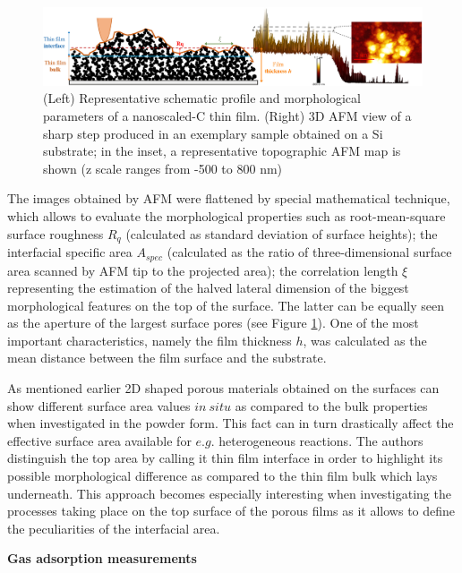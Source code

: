 \begin{figure}[H]
\centering
\includegraphics[width=1\textwidth]{Figures/Theory/AFM_Borghi.jpg}
\medskip
\caption{(Left) Representative schematic profile and morphological parameters of a nanoscaled-C thin film. (Right) 3D AFM view of a sharp step produced in an exemplary sample obtained on a Si substrate; in the inset, a representative topographic AFM map is shown (z scale ranges from -500 to 800 nm) \cite{borghi_quantitative_2019}}
\label{fig:borghi_afm}
\end{figure}

The images obtained by AFM were flattened by special mathematical technique, which allows to evaluate the morphological properties such as root-mean-square surface roughness $R_q$ (calculated as standard deviation of surface heights); the interfacial specific area $A_{spec}$ (calculated as the ratio of three-dimensional surface area scanned by AFM tip to the projected area); the correlation length $\xi$ representing the estimation of the halved lateral dimension of the biggest morphological features on the top of the surface. The latter can be equally seen as the aperture of the largest surface pores (see Figure \ref{fig:borghi_afm}). One of the most important characteristics, namely the film thickness $h$, was calculated as the mean distance between the film surface and the substrate. 

As mentioned earlier 2D shaped porous materials obtained on the surfaces can show different surface area values $in\:situ$ as compared to the bulk properties when investigated in the powder form. This fact can in turn drastically affect the effective surface area available for $e.g.$ heterogeneous reactions. The authors distinguish the top area by calling it thin film interface in order to highlight its possible morphological difference as compared to the thin film bulk which lays underneath. This approach becomes especially interesting when investigating the processes taking place on the top surface of the porous films as it allows to define the peculiarities of the interfacial area. 

\medskip
\textbf{Gas adsorption measurements}

